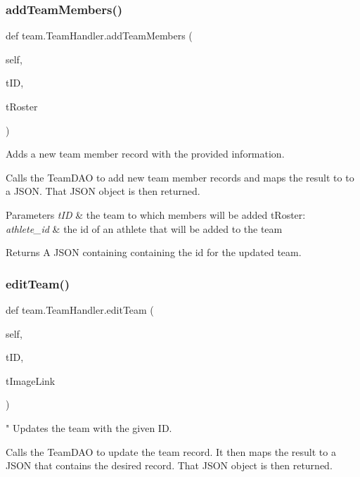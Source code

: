\subsubsection{\texorpdfstring{add\+Team\+Members()}{addTeamMembers()}}
{\footnotesize\ttfamily def team.\+Team\+Handler.\+add\+Team\+Members (\begin{DoxyParamCaption}\item[{}]{self,  }\item[{}]{t\+ID,  }\item[{}]{t\+Roster }\end{DoxyParamCaption})}



Adds a new team member record with the provided information. 

Calls the Team\+D\+AO to add new team member records and maps the result to to a J\+S\+ON. That J\+S\+ON object is then returned.


\begin{DoxyParams}{Parameters}
{\em t\+ID} & the team to which members will be added t\+Roster\+: \\
\hline
{\em athlete\+\_\+id} & the id of an athlete that will be added to the team \\
\hline
\end{DoxyParams}
\begin{DoxyReturn}{Returns}
A J\+S\+ON containing containing the id for the updated team. 
\end{DoxyReturn}
\mbox{\label{classteam_1_1_team_handler_a1408abc9c6130b3b7187876ebcda2f5f}} 
\subsubsection{\texorpdfstring{edit\+Team()}{editTeam()}}
{\footnotesize\ttfamily def team.\+Team\+Handler.\+edit\+Team (\begin{DoxyParamCaption}\item[{}]{self,  }\item[{}]{t\+ID,  }\item[{}]{t\+Image\+Link }\end{DoxyParamCaption})}



" Updates the team with the given ID. 

Calls the Team\+D\+AO to update the team record. It then maps the result to a J\+S\+ON that contains the desired record. That J\+S\+ON object is then returned.


